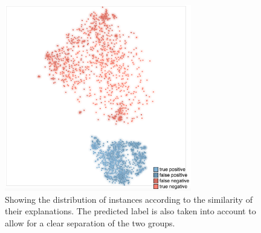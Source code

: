 \begin{figure}
\centering
\includegraphics[height=22em]{figs/new_projection.png}
\caption{
Showing the distribution of instances according to the similarity of their explanations. The predicted label is also taken into account to allow for a clear separation of the two groups.
}
\label{figs:new_projection}
\end{figure}